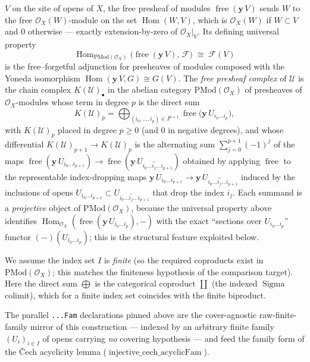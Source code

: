 \begin{definition}
  \(V\) on the site of opens of \(X\), the free presheaf of modules
  \(\operatorname{free}(\mathbf{y}\,V)\) sends \(W\) to the free
  \(\mathcal{O}_X(W)\)-module on the set \(\operatorname{Hom}(W, V)\), which is
  \(\mathcal{O}_X(W)\) if \(W \subset V\) and \(0\) otherwise — exactly
  extension-by-zero of \(\mathcal{O}_X|_V\). Its defining universal property
  \[
    \operatorname{Hom}_{\mathrm{PMod}(\mathcal{O}_X)}\bigl(
      \operatorname{free}(\mathbf{y}\,V),\, \mathcal{F}\bigr)
    \;\cong\; \mathcal{F}(V)
  \]
  is the free–forgetful adjunction for presheaves of modules composed with the
  Yoneda isomorphism \(\operatorname{Hom}(\mathbf{y}\,V, G) \cong G(V)\). The
  \emph{free presheaf complex} of \(\mathcal{U}\) is the chain complex
  \(K(\mathcal{U})_\bullet\) in the abelian category
  \(\mathrm{PMod}(\mathcal{O}_X)\) of presheaves of \(\mathcal{O}_X\)-modules whose
  term in degree \(p\) is the direct sum
  \[
    K(\mathcal{U})_p
      = \bigoplus_{(i_0, \ldots, i_p) \in I^{p+1}}
        \operatorname{free}\bigl(\mathbf{y}\,U_{i_0 \ldots i_p}\bigr),
  \]
  with \(K(\mathcal{U})_p\) placed in degree \(p \geq 0\) (and \(0\) in negative
  degrees), and whose differential \(K(\mathcal{U})_{p+1} \to K(\mathcal{U})_p\) is
  the alternating sum \(\sum_{j=0}^{p+1} (-1)^j\) of the maps
  \(\operatorname{free}(\mathbf{y}\,U_{i_0 \ldots i_{p+1}}) \to
  \operatorname{free}(\mathbf{y}\,U_{i_0 \ldots \widehat{i_j} \ldots i_{p+1}})\)
  obtained by applying \(\operatorname{free}\) to the representable index-dropping
  maps \(\mathbf{y}\,U_{i_0 \ldots i_{p+1}} \to \mathbf{y}\,U_{i_0 \ldots
  \widehat{i_j} \ldots i_{p+1}}\) induced by the inclusions of opens
  \(U_{i_0 \ldots i_{p+1}} \subset U_{i_0 \ldots \widehat{i_j} \ldots i_{p+1}}\)
  that drop the index \(i_j\). Each summand is a \emph{projective} object of
  \(\mathrm{PMod}(\mathcal{O}_X)\), because the universal property above identifies
  \(\operatorname{Hom}_{\mathcal{O}_X}(\operatorname{free}(\mathbf{y}\,U_{i_0 \ldots
  i_p}), -)\) with the exact ``sections over \(U_{i_0 \ldots i_p}\)'' functor
  \((-)(U_{i_0 \ldots i_p})\); this is the structural feature exploited below.

  We assume the index set \(I\) is \emph{finite} (so the required coproducts exist in
  \(\mathrm{PMod}(\mathcal{O}_X)\); this matches the finiteness hypothesis of the
  comparison target). Here the direct sum \(\bigoplus\) is the categorical coproduct
  \(\coprod\) (the indexed \(\operatorname{Sigma}\) colimit), which for a finite index
  set coincides with the finite biproduct.

  The parallel \texttt{...Fam} declarations pinned above are the cover-agnostic
  raw-finite-family mirror of this construction — indexed by an arbitrary finite
  family \((U_i)_{i \in I}\) of opens carrying \emph{no} covering hypothesis — and
  feed the family form of the {\v C}ech acyclicity lemma
  (\(\operatorname{injective\_cech\_acyclicFam}\)).
\end{definition}

